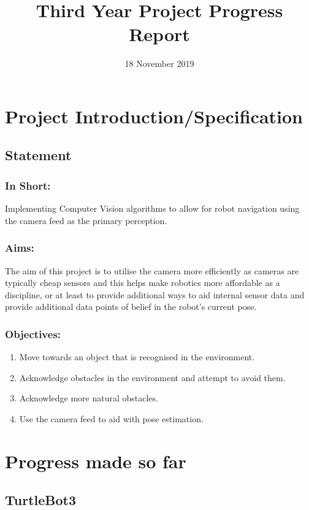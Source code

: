 \documentclass[10pt,a4paper]{report}
\title{Third Year Project Progress Report}
\date{18 November 2019}
\begin{document}
\maketitle
\section*{Project Introduction/Specification}
	\subsection*{Statement}
		\subsubsection*{In Short:}
			Implementing Computer Vision algorithms to allow for robot navigation using the camera feed as the primary perception.
		\subsubsection*{Aims:}
			The aim of this project is to utilise the camera more efficiently as cameras are typically cheap sensors and this helps make robotics more affordable as a discipline, or at least to provide additional ways to aid internal sensor data and provide additional data points of belief in the robot's current pose.
		\subsubsection*{Objectives:}
			\begin{enumerate}
				\item Move towards an object that is recognised in the environment. 
				\item Acknowledge obstacles in the environment and attempt to avoid them.
				\item Acknowledge more natural obstacles.
				\item Use the camera feed to aid with pose estimation.
			\end{enumerate}
\section*{Progress made so far}
	\subsection*{TurtleBot3}
\end{document}
